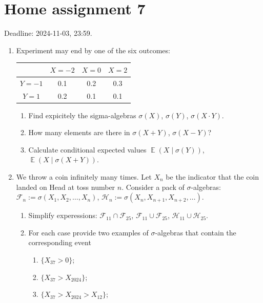 \documentclass[12pt]{article}
\DeclareMathOperator{\E}{\mathbb{E}}
\newcommand{\cF}{\mathcal{F}}
\newcommand{\cH}{\mathcal{H}}
\begin{document}
\begin{enumerate}
\begin{enumerate}
\end{enumerate}

\end{enumerate}



\section*{Home assignment 7}

Deadline: 2024-11-03, 23:59.

\begin{enumerate}
\item Experiment may end by one of the six outcomes:

\begin{tabular}{*{4}{c}}
\toprule
& $X=-2$ & $X=0$ & $X=2$ \\
\midrule
$Y=-1$ & 0.1 & 0.2 & 0.3  \\
$Y=1$ & 0.2 & 0.1 & 0.1  \\
\bottomrule
\end{tabular}

\begin{enumerate}
  \item Find expicitely the sigma-algebras $\sigma(X)$, $\sigma(Y)$, $\sigma(X \cdot Y)$.
  \item How many elements are there in $\sigma(X + Y)$, $\sigma(X - Y)$?
  \item Calculate conditional expected values $\E(X \mid \sigma(Y))$, $\E(X \mid \sigma(X + Y))$.
\end{enumerate}


\item We throw a coin infinitely many times. 
Let $X_{n}$ be the indicator that the coin landed on Head at toss number $n$.
Consider a pack of $\sigma$-algebras: $\cF_{n}:=\sigma(X_1, X_2, \ldots, X_n)$, $\cH_{n}:=\sigma(X_{n}, X_{n+1}, X_{n+2}, \ldots)$.

\begin{enumerate}
\item Simplify experessions: $\cF_{11}\cap \cF_{25}$, $\cF_{11}\cup \cF_{25}$, $\cH_{11}\cup \cH_{25}$.

\item For each case provide two examples of $\sigma$-algebras that contain the corresponding event
\begin{enumerate}
\item $\{X_{37}>0 \}$;
\item $\{X_{37}>X_{2024} \}$;
\item $\{ X_{37}>X_{2024}>X_{12} \}$;
\end{enumerate}


\end{enumerate}
\end{enumerate}
\end{document}
